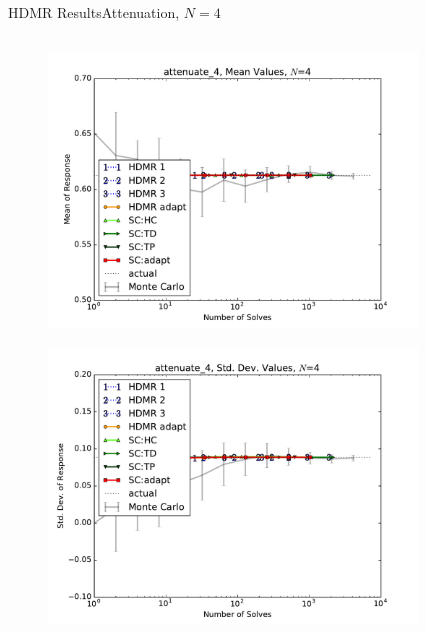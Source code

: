 \documentclass{beamer}
\begin{document}
\begin{frame}{HDMR Results}{Attenuation, $N=4$}\vspace{-20pt}
 \begin{columns}
   \begin{column}{0.5\textwidth}
        \begin{figure}[h!]
          \centering
          \includegraphics[width=0.8\linewidth]{anlmodels/attenuate_4_mean_vals}
        \end{figure}
        \vspace{-20pt}
        \begin{figure}[h!]
          \centering
          \includegraphics[width=0.8\linewidth]{anlmodels/attenuate_4_var_vals}
        \end{figure}
   \end{column}
   \begin{column}{0.5\textwidth}
        \begin{figure}[h!]
          \centering

\end{figure}
\end{column}
\end{columns}
\end{frame}
\end{document}
